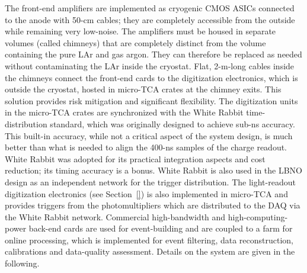 The front-end amplifiers are implemented as cryogenic CMOS
ASICs connected to the anode with 50-cm cables; they are completely
accessible from the outside while remaining very low-noise.
The amplifiers must be housed in separate volumes (called chimneys) that are 
completely distinct from the volume containing the pure LAr and gas argon. They 
can therefore be replaced as needed without contaminating the LAr inside the 
cryostat. 
%
Flat, 2-m-long cables
inside the chimneys connect the front-end cards to the
digitization electronics, which is outside the cryostat, hosted  in
micro-TCA crates at the chimney exits. This solution %
provides risk mitigation and significant flexibility. The digitization
units in the micro-TCA crates are synchronized with the White Rabbit
time-distribution standard,  which was originally designed to
achieve sub-ns accuracy. 
%
This built-in accuracy, while not a critical aspect of the system
design, is much better than what is needed to align the 400-ns samples of
the charge readout. 
White Rabbit was adopted for its practical integration
aspects and cost reduction; its timing accuracy is a bonus.
White Rabbit is also used in the LBNO design as an independent network for
the trigger distribution. The light-readout digitization electronics (see Section~\ref{})
is also implemented in micro-TCA and provides triggers from the
photomultipliers which are distributed to the DAQ via the White Rabbit
network. Commercial high-bandwidth and high-computing-power back-end
cards are used for event-building and are coupled to a farm for online
processing, which is implemented for event filtering, data
reconstruction, calibrations and data-quality assessment. Details on
the system are given in the following. 


